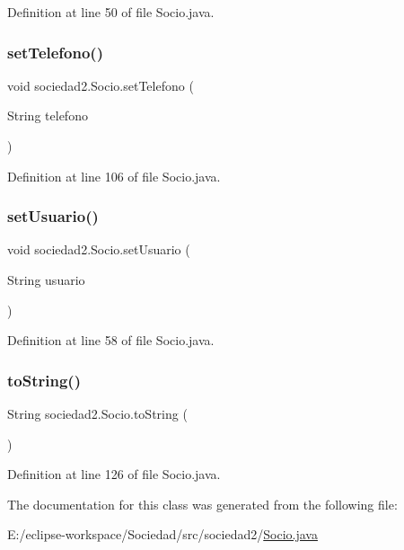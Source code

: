 Definition at line 50 of file Socio.\+java.

\mbox{\label{classsociedad2_1_1_socio_a67d6043669e2f98671fcd2e8c8ff882f}} 
\subsubsection{\texorpdfstring{set\+Telefono()}{setTelefono()}}
{\footnotesize\ttfamily void sociedad2.\+Socio.\+set\+Telefono (\begin{DoxyParamCaption}\item[{String}]{telefono }\end{DoxyParamCaption})}



Definition at line 106 of file Socio.\+java.

\mbox{\label{classsociedad2_1_1_socio_acf29bf517cefc7087b4d1e385e9da862}} 
\subsubsection{\texorpdfstring{set\+Usuario()}{setUsuario()}}
{\footnotesize\ttfamily void sociedad2.\+Socio.\+set\+Usuario (\begin{DoxyParamCaption}\item[{String}]{usuario }\end{DoxyParamCaption})}



Definition at line 58 of file Socio.\+java.

\mbox{\label{classsociedad2_1_1_socio_a12fad8af597150c781fe7e480e61d191}} 
\subsubsection{\texorpdfstring{to\+String()}{toString()}}
{\footnotesize\ttfamily String sociedad2.\+Socio.\+to\+String (\begin{DoxyParamCaption}{ }\end{DoxyParamCaption})}



Definition at line 126 of file Socio.\+java.



The documentation for this class was generated from the following file\+:\begin{DoxyCompactItemize}
\item 
E\+:/eclipse-\/workspace/\+Sociedad/src/sociedad2/\mbox{\hyperlink{_socio_8java}{Socio.\+java}}\end{DoxyCompactItemize}
